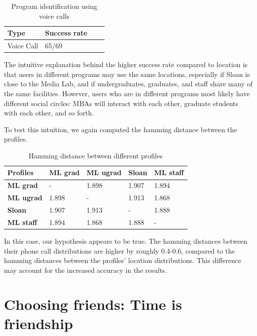 \documentclass[pageno]{jpaper}
\begin{document}
\begin{table}[h!]
  \centering
  \begin{tabular}{|l|l|l|l|}
    \hline
    \textbf{Type} & \textbf{Success rate}\\
    \hline
    \hline
    Voice Call &  65/69\\
    \hline
  \end{tabular}
  \caption{Program identification using voice calls}
  \label{table:formatting}
\end{table}

The intuitive explanation behind the higher success rate compared to location is that users in different programs may use the same locations, especially if Sloan is close to the Media Lab, and if undergraduates, graduates, and staff share many of the same facilities. However, users who are in different programs most likely have different social circles: MBAs will interact with each other, graduate students with each other, and so forth. 

To test this intuition, we again computed the hamming distance between the profiles.

\begin{table}[h!]
  \centering
  \begin{tabular}{|l|l|l|l|l|}
    \hline
    \textbf{Profiles} & \textbf{ML grad} & \textbf{ML ugrad} & \textbf{Sloan} & \textbf{ML staff}\\
    \hline
    \hline
    \textbf{ML grad} & - & 1.898 & 1.907 & 1.894\\
    \hline
    \textbf{ML ugrad} & 1.898  & - & 1.913& 1.868\\
    \hline
    \textbf{Sloan} & 1.907 & 1.913 & - & 1.888\\
    \hline
    \textbf{ML staff} &  1.894 & 1.868& 1.888 & -\\
    \hline
  \end{tabular}
  \caption{Hamming distance between different profiles}
  \label{table:formatting}
\end{table}

In this case, our hypothesis appears to be true. The hamming distances between their phone call distributions are higher by roughly 0.4-0.6, compared to the hamming distances between the profiles' location distributions. This difference may account for the increased accuracy in the results.

\section{Choosing friends: Time is friendship}
\end{document}
